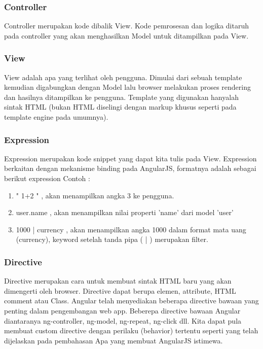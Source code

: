 \subsubsection{Controller}
\label{sub: controller}

	Controller merupakan kode dibalik View. Kode pemrosesan dan logika ditaruh pada controller yang akan menghasilkan Model untuk ditampilkan pada View.

\subsubsection{View}
\label{sub: view}

	View adalah apa yang terlihat oleh pengguna. Dimulai dari sebuah template kemudian digabungkan dengan Model lalu browser melakukan proses rendering dan hasilnya ditampilkan ke pengguna. Template yang digunakan hanyalah sintak HTML (bukan HTML diselingi dengan markup khusus seperti pada template engine pada umumnya).

\subsubsection{Expression}
\label{sub: expression}

	Expression merupakan kode snippet yang dapat kita tulis pada View. Expression berkaitan dengan mekanisme binding pada AngularJS, formatnya adalah sebagai berikut {{ expression }} Contoh :
	
	\begin{enumerate}
		\item "{{ 1+2 }}" , akan menampilkan angka 3 ke pengguna.
		\item {{ user.name }} , akan menampilkan nilai properti 'name' dari model 'user'
		\item {{ 1000 | currency }} , akan menampilkan angka 1000 dalam format mata uang (currency), keyword setelah tanda pipa ( | ) merupakan filter.
	\end{enumerate}

\subsubsection{Directive}
\label{sub: directive}

	Directive merupakan cara untuk membuat sintak HTML baru yang akan dimengerti oleh browser. Directive dapat berupa elemen, attribute, HTML comment atau Class. Angular telah menyediakan beberapa directive bawaan yang penting dalam pengembangan web app. Beberepa directive bawaan Angular diantaranya ng-controller, ng-model, ng-repeat, ng-click dll. Kita dapat pula membuat custom directive dengan perilaku (behavior) tertentu seperti yang telah dijelaskan pada pembahasan Apa yang membuat AngularJS istimewa.
	

	
 